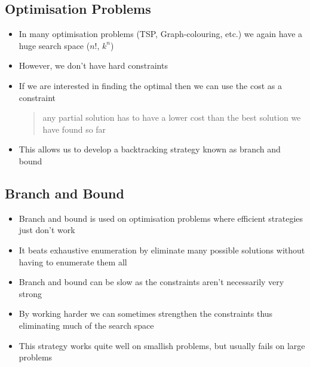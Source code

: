 \Outline %

\begin{slide}
\section{Optimisation Problems}

\begin{PauseHighLight}
  \begin{itemize}
  \item In many optimisation problems (TSP, Graph-colouring, etc.) we
    again have a huge search space ($n!$, $k^n$)\pause
  \item However, we don't have hard constraints\pause
  \item If we are interested in finding the optimal then we can use the
    cost as a constraint
    \begin{quote}
      any partial solution has to have a lower cost than the best
      solution we have found so far\pause
    \end{quote}
  \item This allows us to develop a backtracking strategy known as
    branch and bound\pause
  \end{itemize}
\end{PauseHighLight}

\end{slide}



\begin{slide}
\section{Branch and Bound}

\begin{PauseHighLight}
  \begin{itemize}
  \item Branch and bound is used on optimisation problems where
    efficient strategies just don't work\pause
  \item It beats exhaustive enumeration by eliminate many possible
    solutions without having to enumerate them all\pause
  \item Branch and bound can be slow as the constraints aren't
    necessarily very strong\pause
  \item By working harder we can sometimes strengthen the constraints
    thus eliminating much of the search space\pause
  \item This strategy works quite well on smallish problems, but usually
    fails on large problems\pause
  \end{itemize}
\end{PauseHighLight}

\end{slide}


